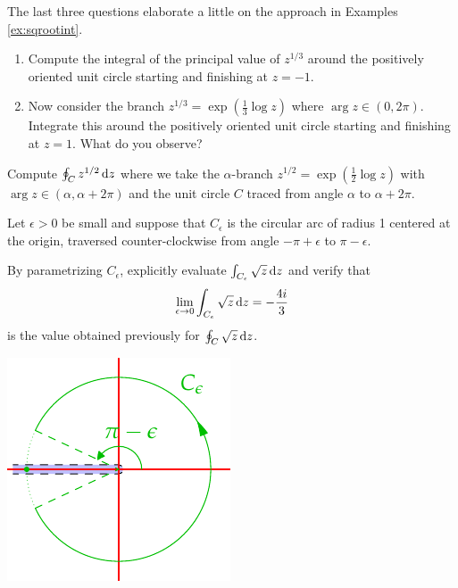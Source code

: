 \begin{exercises*}
\begin{enumerate}
  \item[]The last three questions elaborate a little on the approach in Examples \ref{ex:sqrootint}.
	
	\item\label{exs:cuberootalt}\begin{enumerate}
    \item Compute the integral of the principal value of $z^{1/3}$ around the positively oriented unit circle starting and finishing at $z=-1$.
    \item Now consider the branch $z^{1/3}=\exp(\frac 13\log z)$ where $\arg z\in(0,2\pi)$. Integrate this around the positively oriented unit circle starting and finishing at $z=1$. What do you observe?
  \end{enumerate}
  
  \item Compute $\oint_{C}z^{1/2}\,{\mathrm{d} z}$ where we take the $\alpha$-branch $z^{1/2} =\exp(\frac 12\log z)$ with $\arg z\in(\alpha,\alpha+2\pi)$ and the unit circle $C$ traced from angle $\alpha$ to $\alpha+2\pi$.
	
	\begin{minipage}[t]{0.7\linewidth}\vspace{0pt}
		\item Let $\epsilon>0$ be small and suppose that $C_\epsilon$ is the circular arc of radius 1 centered at the origin, traversed counter-clockwise from angle $-\pi+\epsilon$ to $\pi-\epsilon$.\par
	By parametrizing $C_\epsilon$, explicitly evaluate $\int_{C_\epsilon}\sqrt z\,{\mathrm{d} z}$ and verify that
	\[\lim_{\epsilon\to 0}\int_{C_\epsilon}\sqrt z\,{\mathrm{d} z} =-\frac{4i}3\]
	is the value obtained previously for $\oint_C\sqrt z\,{\mathrm{d} z}$. 
	\end{minipage}\begin{minipage}[t]{0.3\linewidth}\vspace{0pt}
	\flushright\includegraphics{contour-branch4}
	\end{minipage}

  
\end{enumerate}
\end{exercises*}
\clearpage





